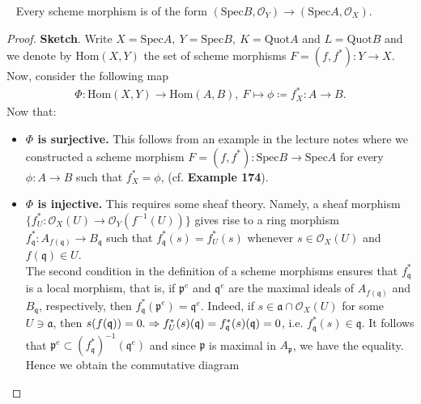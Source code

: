 \documentclass[12pt,a4paper,footinclude=true,headinclude=true]{scrbook} %
\newenvironment{theorem}[2][]
{\renewcommand\theinnercustomthm{#2}\innercustomthm[#1]
\begin{mdframed}[backgroundcolor=yellow!20]\ }
{\end{mdframed}\endinnercustomthm}
\begin{document}
\begin{theorem}{175}
    Every scheme morphism is of the form $(\mathrm{Spec}B,\mathcal{O}_Y)\to (\mathrm{Spec}A,\mathcal{O}_X)$.
\end{theorem}
\begin{proof}
    \textbf{Sketch}. Write $X=\mathrm{Spec}A,\ Y=\mathrm{Spec}B,\ K=\mathrm{Quot}A$ and $L=\mathrm{Quot}B$ and we denote by $\mathrm{Hom}(X,Y)$ the set of scheme morphisms $F=(f,f^\ast):Y\to X$. Now, consider the following map
    \begin{align*}
        \Phi:\mathrm{Hom}(X,Y)\longrightarrow\mathrm{Hom}(A,B),\ F\longmapsto\phi\coloneqq f_X^\ast:A\to B.
    \end{align*}
    Now that:
    \begin{itemize}
        \item \textbf{$\Phi$ is surjective.} This follows from an example in the lecture notes where we constructed a scheme morphism $F=(f,f^\ast): \mathrm{Spec}B\to\mathrm{Spec}A$ for every $\phi:A\to B$ such that $f_X^\ast=\phi$, (cf. \textbf{Example 174}).
        \item \textbf{$\Phi$ is injective.} This requires some sheaf theory. Namely, a sheaf morphism $\{f_U^\ast:\mathcal{O}_X(U)\to \mathcal{O}_{Y}(f^{-1}(U))\}$ gives rise to a ring morphism $f_{\mathfrak{q}}^\ast:A_{f(\mathfrak{q})}\to B_{\mathfrak{q}}$ such that $f_{\mathfrak{q}}^\ast(s)=f_U^\ast(s)$ whenever $s\in\mathcal{O}_X(U)$ and $f(\mathfrak{q})\in U$.\\
        The second condition in the definition of a scheme morphisms ensures that $f_{\mathfrak{q}}^\ast$ is a local morphism, that is, if $\mathfrak{p}^e$ and $\mathfrak{q}^e$ are the maximal ideals of $A_{f(\mathfrak{q})}$ and $B_\mathfrak{q}$, respectively, then $f_\mathfrak{q}^\ast(\mathfrak{p}^e) =\mathfrak{q}^e$. Indeed, if $s\in\mathfrak{a}\cap\mathcal{O}_X(U)$ for some $U\ni\mathfrak{a}$, then $s(f(\mathfrak{q}))=0.\\ \Rightarrow f_U^\ast(s)(\mathfrak{q})=f_\mathfrak{q}^\ast(s)(\mathfrak{q})=0$, i.e. $f_\mathfrak{q}^\ast(s)\in\mathfrak{q}$. It follows that $\mathfrak{p}^e \subset(f_\mathfrak{q}^\ast)^{-1}(\mathfrak{q}^e)$ and since $\mathfrak{p}$ is maximal in $A_\mathfrak{p}$, we have the equality.\\ Hence we obtain the commutative diagram
        \begin{center}
\end{center}
\end{itemize}
\end{proof}
\end{document}
